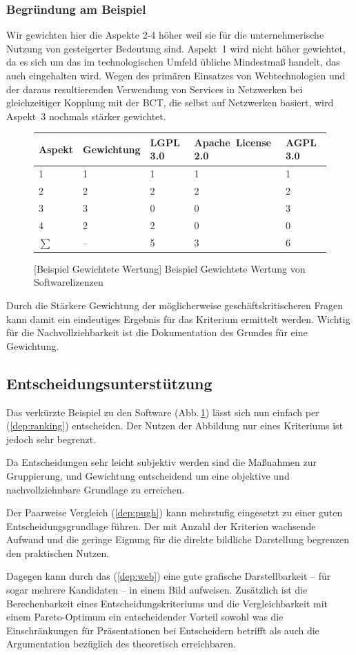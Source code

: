 \subsubsection*{Begründung am Beispiel}
Wir gewichten hier die Aspekte 2-4 höher weil sie für die unternehmerische Nutzung von gesteigerter Bedeutung sind.
Aspekt~1 wird nicht höher gewichtet, da es sich um das im technologischen Umfeld übliche Mindestmaß handelt, das auch eingehalten wird.
Wegen des primären Einsatzes von Webtechnologien und der daraus resultierenden Verwendung von Services in Netzwerken bei gleichzeitiger Kopplung mit der \gls{BCT}, die selbst auf Netzwerken basiert, wird Aspekt~3 nochmals stärker gewichtet.

\begin{figure}[!htp]
\centering
\begin{tabular}{l|llll}
Aspekt	& Gewichtung & LGPL\,3.0 	& Apache~License\,2.0 & AGPL\,3.0 \\
\hline
\hline
1 		& 1	& 1	& 1	& 1	\\
\hline
2 		& 2	& 2	& 2	& 2	\\
\hline
3 		& 3	& 0	& 0	& 3	\\
\hline
4		& 2	& 2 & 0 & 0 \\
\hline
\hline
\(\sum\)& --& 5 & 3 & 6 \\
\end{tabular}
[Beispiel Gewichtete Wertung]{\label{abb:wertung:oss2} Beispiel Gewichtete Wertung von Softwarelizenzen}
\end{figure}

Durch die Stärkere Gewichtung der möglicherweise geschäftskritischeren Fragen kann damit ein eindeutiges Ergebnis für das Kriterium ermittelt werden.
Wichtig für die Nachvollziehbarkeit ist die Dokumentation des Grundes für eine Gewichtung.

\subsection{Entscheidungsunterstützung}

Das verkürzte Beispiel zu den Software (Abb.\,\ref{abb:wertung:oss2}) lässt sich nun einfach per  (\ref{dep:ranking}) entscheiden.
Der Nutzen der Abbildung nur eines Kriteriums ist jedoch sehr begrenzt.

Da Entscheidungen sehr leicht subjektiv werden sind die Maßnahmen zur Gruppierung,  und Gewichtung entscheidend um
eine objektive und nachvollziehnbare Grundlage zu erreichen.

Der Paarweise Vergleich (\ref{dep:pugh}) kann mehrstufig eingesetzt zu einer guten Entscheidungsgrundlage führen.
Der mit Anzahl der Kriterien wachsende Aufwand und die geringe Eignung für die direkte bildliche Darstellung begrenzen den praktischen Nutzen.

Dagegen kann durch das  (\ref{dep:web}) eine gute grafische Darstellbarkeit -- für sogar mehrere Kandidaten -- in einem Bild aufweisen.
Zusätzlich ist die Berechenbarkeit eines Entscheidungskriteriums und die Vergleichbarkeit mit einem Pareto-Optimum ein entscheidender Vorteil sowohl was die Einschränkungen für Präsentationen bei Entscheidern betrifft als auch die Argumentation bezüglich des theoretisch erreichbaren.
